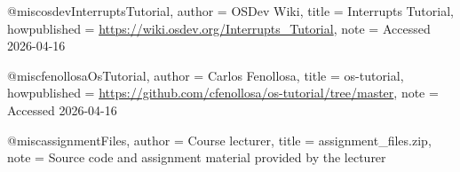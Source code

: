 @misc{osdevInterruptsTutorial,
  author       = {{OSDev Wiki}},
  title        = {{Interrupts Tutorial}},
  howpublished = {\url{https://wiki.osdev.org/Interrupts_Tutorial}},
  note         = {Accessed 2026-04-16}
}

@misc{fenollosaOsTutorial,
  author       = {Carlos Fenollosa},
  title        = {{os-tutorial}},
  howpublished = {\url{https://github.com/cfenollosa/os-tutorial/tree/master}},
  note         = {Accessed 2026-04-16}
}

@misc{assignmentFiles,
  author       = {{Course lecturer}},
  title        = {{assignment\_files.zip}},
  note         = {Source code and assignment material provided by the lecturer}
}
